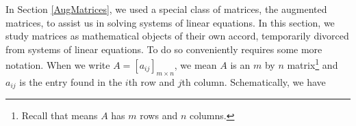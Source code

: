 \documentclass{ximera}
\begin{document}
	\author{Stitz-Zeager}




\setcounter{footnote}{0}

\label{MatArithmetic}

\setlength{\extrarowheight}{0pt}

In Section \ref{AugMatrices}, we used a special class of matrices, the augmented matrices, to assist us in solving systems of linear equations.  In this section, we study matrices as mathematical objects of their own accord, temporarily divorced from systems of linear equations.  To do so conveniently requires some more notation.  When we write $A = \left[ a_{ij}  \right]_{m \times n}$, we mean $A$ is an $m$ by $n$ matrix\footnote{Recall that means $A$ has $m$ rows and $n$ columns.} and $a_{ij}$ is the entry found in the $i$th row and $j$th column.  Schematically, we have



\end{document}
